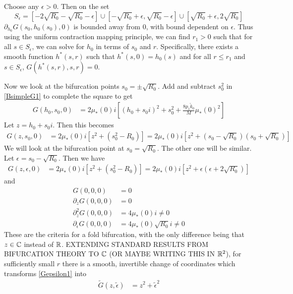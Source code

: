 \documentclass[thesis.tex]{subfiles}
\begin{document}
Choose any $\epsilon > 0$. Then on the set
\[
S_\epsilon = [-2 \sqrt{R_0} -\sqrt{R_0} - \epsilon]
\cup [-\sqrt{R_0} + \epsilon, \sqrt{R_0} - \epsilon]
\cup [\sqrt{R_0} + \epsilon, 2\sqrt{R_0}]
\]
$\partial_{h_0} G(s_0, h_0(s_0), 0)$ is bounded away from 0, with bound dependent on $\epsilon$. Thus using the uniform contraction mapping principle, we can find $r_1 > 0$ such that for all $s \in S_\epsilon$, we can solve for $h_0$ in terms of $s_0$ and $r$. Specifically, there exists a smooth function $h^*(s, r)$ such that $h^*(s, 0) = h_0(s)$ and for all $r \leq r_1$ and $s \in S_\epsilon$, $G(h^*(s,r),s,r) = 0$.

Now we look at the bifurcation points $s_0 = \pm \sqrt{R_0}$. Add and subtract $s_0^2$ in \cref{BsimpleG1} to complete the square to get
\begin{equation*}
\begin{aligned}
G(h_0, s_0, 0) &= 2 \mu_*(0) i\left[ (h_0 + s_0 i)^2 + s_0^2 + \frac{8 p_1 \tilde{k}_0}{M} \mu_*(0)^2 \right] 
\end{aligned}
\end{equation*}
Let $z = h_0 + s_0 i$. Then this becomes
\begin{equation*}
\begin{aligned}
G(z, s_0, 0) &= 2 \mu_*(0) i\left[z^2 + (s_0^2 - R_0) \right] = 2 \mu_*(0) i\left[z^2 + (s_0 - \sqrt{R_0})(s_0 + \sqrt{R_0}) \right]
\end{aligned}
\end{equation*}
We will look at the bifurcation point at $s_0 = \sqrt{R_0}$. The other one will be similar. Let $\epsilon = s_0 - \sqrt{R_0}$. Then we have
\begin{equation}\label{Gepsilon1}
\begin{aligned}
G(z, \epsilon, 0) &= 2 \mu_*(0) i\left[z^2 + (s_0^2 - R_0) \right] = 2 \mu_*(0) i\left[z^2 + \epsilon(\epsilon + 2 \sqrt{R_0}) \right]
\end{aligned}
\end{equation}
and
\begin{align*}
G(0, 0, 0) &= 0 \\
\partial_z G(0,0,0) &= 0 \\
\partial_z^2 G(0,0,0) &= 4 \mu_*(0) i \neq 0 \\
\partial_\epsilon G(0, 0, 0) &= 4 \mu_*(0) \sqrt{R_0} i \neq 0
\end{align*}
These are the criteria for a fold bifurcation, with the only difference being that $z \in \mathbb{C}$ instead of $\mathbb{R}$. EXTENDING STANDARD RESULTS FROM BIFURCATION THEORY TO $\mathbb{C}$ (OR MAYBE WRITING THIS IN $\mathbb{R}^2$), for sufficiently small $r$ there is a smooth, invertible change of coordinates which transforms \cref{Gepsilon1} into
\begin{equation}\label{Gepsilon2}
\begin{aligned}
\tilde{G}(z, \tilde{\epsilon}) &= z^2 + \tilde{\epsilon}^2
\end{aligned}
\end{equation}

\iffulldocument\else
	
	
\fi
\end{document}
